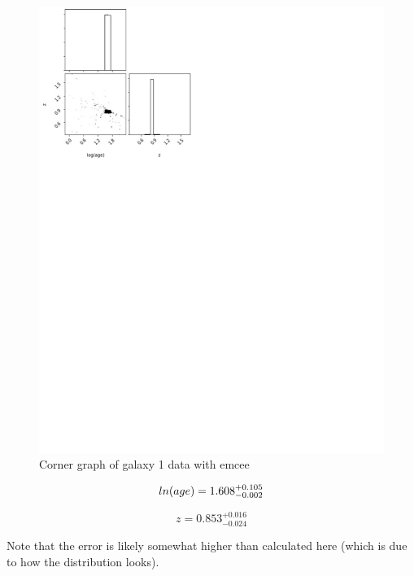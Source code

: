\documentclass{article}
\begin{document}
\begin{figure}[H]
  \centering
\includegraphics[scale=0.5]{Corner Graph Galaxy 1}
\caption{Corner graph of galaxy 1 data with emcee}
\end{figure}

$$ln{\textrm(age)} = 1.608^{+0.105}_{-0.002}$$

$$z = 0.853^{+0.016}_{-0.024}$$

Note that the error is likely somewhat higher than calculated here (which is due to how the distribution looks).
\end{document}
